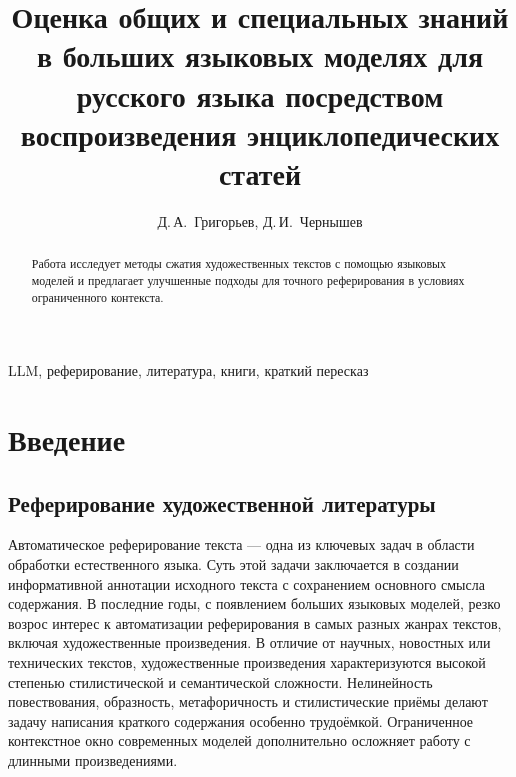 \documentclass{article}
\theoremstyle{definition}
\theoremstyle{plain}
\begin{document}


\title{Оценка общих и специальных знаний в больших языковых моделях для русского языка посредством воспроизведения энциклопедических статей}

\author{Д.\,А.~Григорьев\Addressmark[1]\Emailmark[1], Д.\,И.~Чернышев\Addressmark[1]\Emailmark[2]}








\maketitle

\begin{abstract}
Работа исследует методы сжатия художественных текстов с помощью языковых моделей и предлагает улучшенные подходы для точного реферирования в условиях ограниченного контекста.
\end{abstract}

\begin{keywords}
LLM, реферирование, литература, книги, краткий пересказ
\end{keywords}

\section*{Введение}
\subsection*{Реферирование художественной литературы}
Автоматическое реферирование текста — одна из ключевых задач в области обработки естественного языка. Суть этой задачи заключается в создании информативной аннотации исходного текста с сохранением основного смысла содержания. В последние годы, с появлением больших языковых моделей, резко возрос интерес к автоматизации реферирования в самых разных жанрах текстов, включая художественные произведения. В отличие от научных, новостных или технических текстов, художественные произведения характеризуются высокой степенью стилистической и семантической сложности. Нелинейность повествования, образность, метафоричность и стилистические приёмы делают задачу написания краткого содержания особенно трудоёмкой. Ограниченное контекстное окно современных моделей дополнительно осложняет работу с длинными произведениями.
\end{document}

